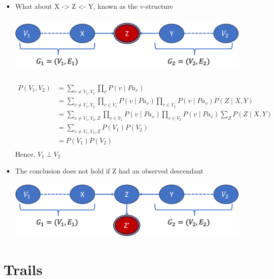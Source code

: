 \documentclass[11pt,a4paper]{report}
\begin{document}
\begin{itemize}
    \item What about X -> Z <- Y, known as the v-structure
    \begin{center}
        \includegraphics[width = 12cm, height = 3cm]{global_indep5.png}\\
    \end{center}
    \begin{equation}
    \begin{split}
        P(V_{1},V_{2}) & = \sum_{v \neq V_{1},V_{2}} \prod_{v}P(v \mid Pa_{v})\\
        & = \sum_{v \neq V_{1},V_{2}} \prod_{v \in V_{1}}P(v \mid Pa_{v}) \prod_{v \in V_{2}}P(v \mid Pa_{v})P(Z \mid X,Y)\\
        & = \sum_{v \neq V_{1},V_{2},Z} \prod_{v \in V_{1}}P(v \mid Pa_{v}) \prod_{v \in V_{2}}P(v \mid Pa_{v})\sum_{Z}P(Z \mid X,Y)\\
        & = \sum_{v \neq V_{1},V_{2},Z}P(V_{1})P(V_{2})\\
        & = P(V_{1})P(V_{2})\\
    \end{split}
    \end{equation}
    Hence, $V_{1} \perp V_{2}$ 
    \item The conclusion does not hold if Z had an observed descendant
    \begin{center}
        \includegraphics[width = 12cm, height = 3cm]{global_indep6.png}\\
    \end{center}
\end{itemize}

\section{Trails}
\end{document}

